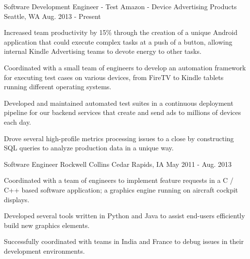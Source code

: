 

\begin{cventries}

  \cventry
    {Software Development Engineer - Test} %
    {Amazon - Device Advertising Products} %
    {Seattle, WA} %
    {Aug. 2013 - Present} %
    {
      \begin{cvitems} %
        \item {Increased team productivity by 15\% through the creation of a unique Android application that could execute complex tasks at a push of a button, allowing internal Kindle Advertising teams to devote energy to other tasks.}
        \item {}
        \item {}
        \item {}
        \item {}
        \item {}
        \item {Coordinated with a small team of engineers to develop an automation framework for executing test cases on various devices, from FireTV to Kindle tablets running different operating systems.}
        \item {Developed and maintained automated test suites in a continuous deployment pipeline for our backend services that create and send ads to millions of devices each day.}
        \item {Drove several high-profile metrics processing issues to a close by constructing SQL queries to analyze production data in a unique way.}
      \end{cvitems}
    }

  \cventry
    {Software Engineer} %
    {Rockwell Collins} %
    {Cedar Rapids, IA} %
    {May 2011 - Aug. 2013} %
    {
      \begin{cvitems} %
        \item {Coordinated with a team of engineers to implement feature requests in a C / C++ based software application; a graphics engine running on aircraft cockpit displays.}
        \item {Developed several tools written in Python and Java to assist end-users efficiently build new graphics elements.}
        \item {Successfully coordinated with teams in India and France to debug issues in their development environments.}
      \end{cvitems}
    }

\end{cventries}
